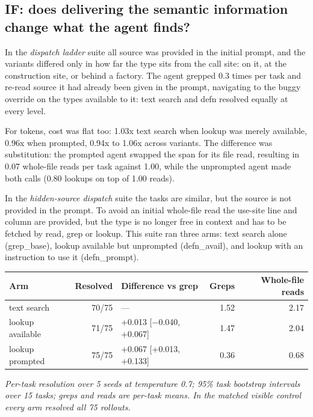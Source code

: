 \documentclass[
]{article}
\newcounter{none} %
\begin{document}
\subsection{IF: does delivering the semantic information change what the
agent
finds?}\label{if-does-delivering-the-semantic-information-change-what-the-agent-finds}

In the \emph{dispatch ladder} suite all source was provided in the
initial prompt, and the variants differed only in how far the type sits
from the call site: on it, at the construction site, or behind a
factory. The agent grepped 0.3 times per task and re-read source it had
already been given in the prompt, navigating to the buggy override on
the types available to it: text search and defn resolved equally at
every level.

For tokens, cost was flat too: 1.03x text search when lookup was merely
available, 0.96x when prompted, 0.94x to 1.06x across variants. The
difference was substitution: the prompted agent swapped the span for its
file read, resulting in 0.07 whole-file reads per task against 1.00,
while the unprompted agent made both calls (0.80 lookups on top of 1.00
reads).

In the \emph{hidden-source dispatch} suite the tasks are similar, but
the source is not provided in the prompt. To avoid an initial whole-file
read the use-site line and column are provided, but the type is no
longer free in context and has to be fetched by read, grep or lookup.
This suite ran three arms: text search alone (grep\_base), lookup
available but unprompted (defn\_avail), and lookup with an instruction
to use it (defn\_prompt).

{\def\LTcaptype{none} %
\begin{longtable}[]{@{}lrlrr@{}}
\toprule\noalign{}
Arm & Resolved & Difference vs grep & Greps & Whole-file reads \\
\midrule\noalign{}
\endhead
\bottomrule\noalign{}
\endlastfoot
text search & 70/75 & --- & 1.52 & 2.17 \\
lookup available & 71/75 & +0.013 {[}−0.040, +0.067{]} & 1.47 & 2.04 \\
lookup prompted & 75/75 & +0.067 {[}+0.013, +0.133{]} & 0.36 & 0.68 \\
\end{longtable}
}

\emph{Per-task resolution over 5 seeds at temperature 0.7; 95\% task
bootstrap intervals over 15 tasks; greps and reads are per-task means.
In the matched visible control every arm resolved all 75 rollouts.}
\end{document}
